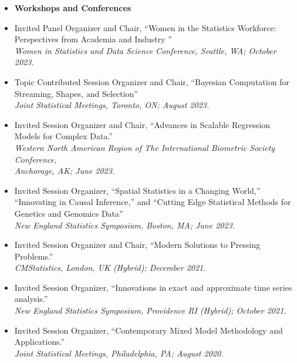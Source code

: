 \documentclass[11pt]{article}
\newcommand{\tab}{\hspace*{2em}}
\begin{document}
\begin{itemize} 
	\item[] \textbf{Workshops and Conferences}  \vspace{-2mm}
	\item[] Invited Panel Organizer and Chair, ``Women in the Statistics Workforce: Perspectives from Academia and Industry
'' \hfill   \\
	\tab \emph{Women in Statistics and Data Science Conference, Seattle, WA; October 2023.}  \vspace{-2mm}
	\item[] Topic Contributed Session Organizer and Chair, ``Bayesian Computation for Streaming, Shapes, and Selection'' \hfill   \\
	\tab \emph{Joint Statistical Meetings, Toronto, ON; August 2023.}  \vspace{-2mm}
	\item[] Invited Session Organizer and Chair, ``Advances in Scalable Regression Models for Complex Data.'' \hfill   \\
	\tab \emph{Western North American Region of The International Biometric Society Conference,} \\
	\tab \emph{Anchorage, AK; June 2023.}  \vspace{-2mm}
	\item[] Invited Session Organizer, ``Spatial Statistics in a Changing World,'' ``Innovating in Causal Inference,'' and ``Cutting Edge Statistical Methods for Genetics and Genomics Data'' \hfill   \\
	\tab \emph{New England Statistics Symposium, Boston, MA; June 2023.}  \vspace{-2mm}
	\item[] Invited Session Organizer and Chair, ``Modern Solutions to Pressing Problems.'' \hfill   \\
	\tab \emph{CMStatistics, London, UK (Hybrid); December 2021.}  \vspace{-2mm}
	\item[] Invited Session Organizer, ``Innovations in exact and approximate time series analysis.'' \hfill   \\
	\tab \emph{New England Statistics Symposium, Providence RI (Hybrid); October 2021.}  \vspace{-2mm}
	\item[] Invited Session Organizer, ``Contemporary Mixed Model Methodology and Applications.'' \hfill   \\
	\tab \emph{Joint Statistical Meetings, Philadelphia, PA; August 2020.}  \vspace{-2mm}

\end{itemize}
\end{document}
